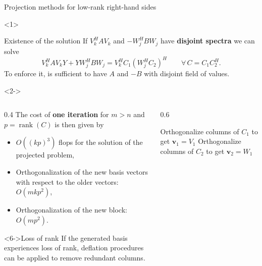 \documentclass[aspectratio=169,xcolor=dvipsnames]{beamer}
\begin{document}
	\begin{frame}{Projection methods for low-rank right-hand sides}
	\begin{onlyenv}\begin{block}{Existence of the solution}
	If $V_k^H A V_k$ and $- W_j^H B W_j$ have \textbf{disjoint spectra} we can solve 
	\[
	V_k^H A V_k Y + Y W_j^H B W_j = V_k^H C_1 (W_j^H C_2)^H \qquad \forall\,C = C_1 C_2^H.
	\]
	To enforce it, is sufficient to have $A$ and $-B$ with disjoint field of values.
	\end{block}\end{onlyenv}\begin{onlyenv}<2->
	\begin{columns}
	\begin{column}{0.4\columnwidth}
	The cost of \textbf{one iteration} for $m > n$ and $p = \operatorname{rank}(C)$ is then given by
	\begin{itemize}
		\item[\faMoneyBillWave]<3-> $O((kp)^3)$ flops for the solution of the projected problem,
		\item[\faMoneyBillWave]<4-> Orthogonalization of the new basis vectors with respect to the older vectors: $O(mkp^2)$,
		\item[\faMoneyBillWave]<5-> Orthogonalization of the new block: $O(mp^2)$.
	\end{itemize}\vspace{-0.7em}
	\begin{block}<6->{Loss of rank}
	If the generated basis experiences loss of rank, deﬂation procedures can be applied to remove redundant columns.
	\end{block}
	\end{column}
	\begin{column}{0.6\columnwidth}
	\begin{algorithm}[H]\small
	Orthogonalize columns of $C_1$ to get $\mathbf{v}_1 = V_1$\;
	Orthogonalize columns of $C_2$ to get $\mathbf{v}_2 = W_1$\;
	\end{algorithm}
	\end{column}
	\end{columns}
	\end{onlyenv}
	\end{frame}
\end{document}
